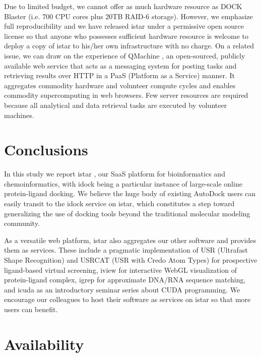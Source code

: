 Due to limited budget, we cannot offer as much hardware resource as DOCK Blaster (i.e. 700 CPU cores plus 20TB RAID-6 storage). However, we emphasize full reproducibility \citep{965} and we have released istar under a permissive open source license so that anyone who possesses sufficient hardware resource is welcome to deploy a copy of istar to his/her own infrastructure with no charge. On a related issue, we can draw on the experience of QMachine \citep{1405}, an open-sourced, publicly available web service that acts as a messaging system for posting tasks and retrieving results over HTTP in a PaaS (Platform as a Service) manner. It aggregates commodity hardware and volunteer compute cycles and enables commodity supercomputing in web browsers. Few server resources are required because all analytical and data retrieval tasks are executed by volunteer machines.

\section{Conclusions}

In this study we report istar \citep{1362}, our SaaS platform for bioinformatics and chemoinformatics, with idock \citep{1153} being a particular instance of large-scale online protein-ligand docking. We believe the huge body of existing AutoDock users can easily transit to the idock service on istar, which constitutes a step toward generalizing the use of docking tools beyond the traditional molecular modeling community.

As a versatile web platform, istar also aggregates our other software and provides them as services. These include a pragmatic implementation of USR (Ultrafast Shape Recognition) \citep{1379} and USRCAT (USR with Credo Atom Types) \citep{1331} for prospective ligand-based virtual screening, iview \citep{1366} for interactive WebGL visualization of protein-ligand complex, igrep \citep{1138} for approximate DNA/RNA sequence matching, and icuda as an introductory seminar series about CUDA programming. We encourage our colleagues to host their software as services on istar so that more users can benefit.


\section{Availability}

